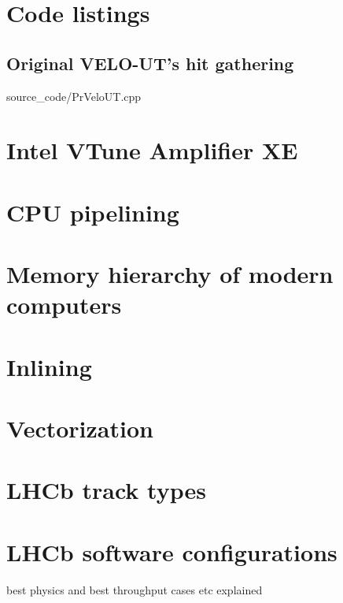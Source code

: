 \documentclass[12pt]{article}
\begin{document}

\appendix

\newpage
\section{Code listings}

\subsection{Original VELO-UT's hit gathering}

	{source_code/PrVeloUT.cpp}
\newpage

\section{Intel VTune Amplifier XE}

\section{CPU pipelining}

\section{Memory hierarchy of modern computers}

\section{Inlining}

\section{Vectorization}

\section{LHCb track types}

\section{LHCb software configurations}

best physics and best throughput cases etc explained
\end{document}
